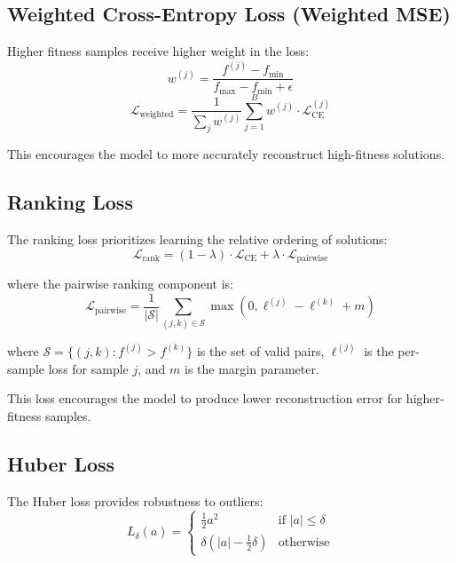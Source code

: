 \documentclass[11pt,a4paper]{article}
\begin{document}
\subsection{Weighted Cross-Entropy Loss (Weighted MSE)}

Higher fitness samples receive higher weight in the loss:
\begin{equation}
    w^{(j)} = \frac{f^{(j)} - f_{\min}}{f_{\max} - f_{\min} + \epsilon}
\end{equation}
\begin{equation}
    \mathcal{L}_{\text{weighted}} = \frac{1}{\sum_j w^{(j)}}\sum_{j=1}^{B} w^{(j)} \cdot \mathcal{L}_{\text{CE}}^{(j)}
\end{equation}

This encourages the model to more accurately reconstruct high-fitness solutions.

\subsection{Ranking Loss}

The ranking loss prioritizes learning the relative ordering of solutions:
\begin{equation}
    \mathcal{L}_{\text{rank}} = (1-\lambda) \cdot \mathcal{L}_{\text{CE}} + \lambda \cdot \mathcal{L}_{\text{pairwise}}
\end{equation}

where the pairwise ranking component is:
\begin{equation}
    \mathcal{L}_{\text{pairwise}} = \frac{1}{|\mathcal{S}|} \sum_{(j,k) \in \mathcal{S}} \max\left(0, \ell^{(j)} - \ell^{(k)} + m\right)
\end{equation}

where $\mathcal{S} = \{(j,k) : f^{(j)} > f^{(k)}\}$ is the set of valid pairs, $\ell^{(j)}$ is the per-sample loss for sample $j$, and $m$ is the margin parameter.

This loss encourages the model to produce lower reconstruction error for higher-fitness samples.

\subsection{Huber Loss}

The Huber loss provides robustness to outliers:
\begin{equation}
    L_\delta(a) = \begin{cases}
        \frac{1}{2}a^2 & \text{if } |a| \leq \delta \\
        \delta(|a| - \frac{1}{2}\delta) & \text{otherwise}
    \end{cases}
\end{equation}
\end{document}
